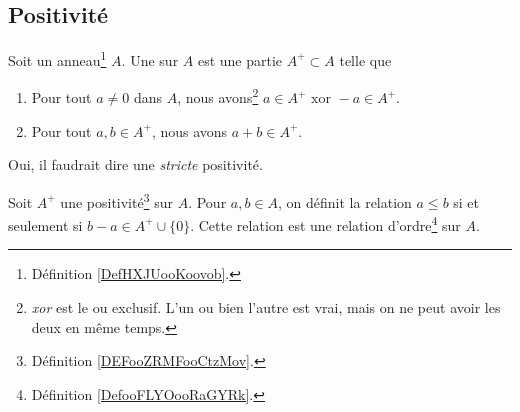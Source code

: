 \subsection{Positivité}
\label{SUBooPositiviteAnneaux}

\begin{definition}	\label{DEFooZRMFooCtzMov}
	Soit un anneau\footnote{Définition \ref{DefHXJUooKoovob}.} \( A\). Une  sur \( A\) est une partie \( A^+\subset A\) telle que
	\begin{enumerate}
		\item
		      Pour tout \( a\neq 0\) dans \( A\), nous avons\footnote{\emph{xor} est le ou exclusif. L'un ou bien l'autre est vrai, mais on ne peut avoir les deux en même temps.} \( a\in A^+ \text{ xor } -a\in A^+\).
		\item
		      Pour tout \( a,b\in A^+\), nous avons \( a+b\in A^+\).
	\end{enumerate}
	Oui, il faudrait dire une \emph{stricte} positivité.
\end{definition}

\begin{proposition}	\label{PROPooKLOPooBgQqhM}
	Soit \( A^+\) une positivité\footnote{Définition \ref{DEFooZRMFooCtzMov}.} sur \( A\). Pour \( a, b \in A \), on définit la relation \( a\leq b\) si et seulement si \( b-a\in A^+\cup\{ 0 \}\). Cette relation est une relation d'ordre\footnote{Définition \ref{DefooFLYOooRaGYRk}.} sur \( A \).
\end{proposition}

